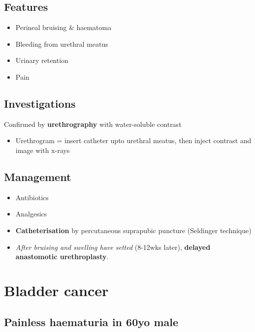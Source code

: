 \documentclass[
  12pt,
]{memoir}
\providecommand{\tightlist}{%
  \setlength{\itemsep}{0pt}\setlength{\parskip}{0pt}}
\begin{document}
\hypertarget{features-6}{%
\subsection{Features}\label{features-6}}

\begin{itemize}
\tightlist
\item
  Perineal bruising \& haematoma
\item
  Bleeding from urethral meatus
\item
  Urinary retention
\item
  Pain
\end{itemize}

\hypertarget{investigations-5}{%
\subsection{Investigations}\label{investigations-5}}

Confirmed by \textbf{urethrography} with water-soluble contrast

\begin{itemize}
\tightlist
\item
  Urethrogram = insert catheter upto urethral meatus, then inject
  contrast and image with x-rays
\end{itemize}

\hypertarget{management}{%
\subsection{Management}\label{management}}

\begin{itemize}
\tightlist
\item
  Antibiotics
\item
  Analgesics
\item
  \textbf{Catheterisation} by percutaneous suprapubic puncture
  (Seldinger technique)
\item
  \emph{After bruising and swelling have setted} (8-12wks later),
  \textbf{delayed anastomotic urethroplasty}.
\end{itemize}

\pagebreak

\hypertarget{bladder-cancer}{%
\section{Bladder cancer}\label{bladder-cancer}}

\hypertarget{painless-haematuria-in-60yo-male}{%
\subsection{Painless haematuria in 60yo
male}\label{painless-haematuria-in-60yo-male}}
\end{document}
